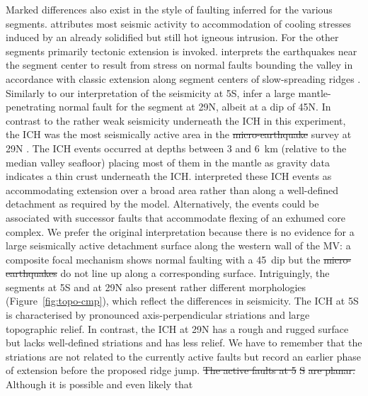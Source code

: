 \documentclass[jgrga]{agu2001} %
\newlength{\tw}
\providecommand{\DIFadd}[1]{{\protect\color{blue}\uwave{#1}}} %
\providecommand{\DIFdel}[1]{{\protect\color{red}\sout{#1}}}                      %
\providecommand{\DIFaddbegin}{} %
\providecommand{\DIFaddend}{} %
\providecommand{\DIFdelbegin}{} %
\providecommand{\DIFdelend}{} %
\begin{document}
\begin{article}
Marked differences also
exist in  the style of faulting inferred for the various segments.
\citet{kong92} attributes most seismic activity to accommodation of
cooling stresses induced by an already solidified but still hot
igneous intrusion. For the other segments primarily tectonic extension
is invoked.  \citet{barclay01} interprets the earthquakes 
 near the
segment center to result from  stress on normal faults bounding the
valley in accordance with classic extension along segment centers of
slow-spreading ridges \citep{mutter92}.   Similarly to our
interpretation of the seismicity at 5\dg S, \citet{toomey88} infer a
large mantle-penetrating 
normal fault for the segment at 29\dg N, albeit
at a dip of 45\dg N.  In contrast to the rather weak seismicity
underneath the ICH in this experiment, the ICH was the most
seismically active area in the \DIFdelbegin \DIFdel{micro-earthquake }\DIFdelend \DIFaddbegin \DIFadd{microearthquake }\DIFaddend survey at 29\dg N
\citep{wolfe95}.  The ICH events occurred at depths between 3
and 6~km (relative to the median valley seafloor) placing most of them
in the mantle as gravity data
indicates a thin crust underneath the ICH.  \citet{wolfe95} interpreted
these ICH events as accommodating extension over a broad area rather
than along a well-defined detachment as required by the
\citet{tucholke94} model. Alternatively, the events could be
associated with successor faults that accommodate flexing of an
exhumed core complex.  We prefer the original interpretation because
there is no evidence for a large seismically active detachment surface
along the western wall of the MV: a composite focal mechanism shows
normal faulting with a 45\dg\ dip but the \DIFdelbegin \DIFdel{micro-earthquakes }\DIFdelend \DIFaddbegin \DIFadd{microearthquakes }\DIFaddend do not
line up along  a corresponding surface.
Intriguingly, the segments at 5\dg S and at 29\dg N also
present rather different morphologies (Figure~\ref{fig:topo-cmp}),
which reflect the differences in seismicity.  The ICH at
5\dg S is characterised by pronounced axis-perpendicular striations
and large topographic relief.  In contrast, the ICH at 29\dg N has a
rough and rugged surface but lacks well-defined striations and has
less relief. We have to remember that the striations \DIFaddbegin \DIFadd{at 5}\dg \DIFadd{S }\DIFaddend are not
related to the currently active faults but record an earlier phase of
extension before the proposed ridge jump.  \DIFdelbegin \DIFdel{The active faults at 5}%
\DIFdel{S}%
\DIFdel{are planar. }\DIFdelend Although it is possible and even likely that

\end{article}
\end{document}
